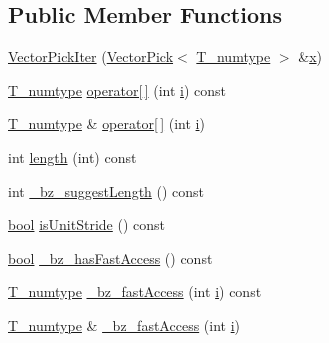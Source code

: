 \subsection*{Public Member Functions}
\begin{DoxyCompactItemize}
\item 
\hyperlink{classVectorPickIter_a834212637140ee41fe3614c6af3f2b32}{Vector\+Pick\+Iter} (\hyperlink{classVectorPick}{Vector\+Pick}$<$ \hyperlink{classVectorPickIter_a105b4687faac1a8a5ee37bdec8163f92}{T\+\_\+numtype} $>$ \&\hyperlink{vecnorm1_8cc_ac73eed9e41ec09d58f112f06c2d6cb63}{x})
\item 
\hyperlink{classVectorPickIter_a105b4687faac1a8a5ee37bdec8163f92}{T\+\_\+numtype} \hyperlink{classVectorPickIter_a70b6552aec5448cd841bc0f677c3e2c6}{operator\mbox{[}$\,$\mbox{]}} (int \hyperlink{indexexpr_8h_aabd77643995707c185e95c8cb2782c81}{i}) const 
\item 
\hyperlink{classVectorPickIter_a105b4687faac1a8a5ee37bdec8163f92}{T\+\_\+numtype} \& \hyperlink{classVectorPickIter_a2bb0290a79c3f855b5ef93a18b09d722}{operator\mbox{[}$\,$\mbox{]}} (int \hyperlink{indexexpr_8h_aabd77643995707c185e95c8cb2782c81}{i})
\item 
int \hyperlink{classVectorPickIter_a8ce5e1eaf57976ae9048d4d364172b8c}{length} (int) const 
\item 
int \hyperlink{classVectorPickIter_a3e6561605f364f742cf77915cbeba6c5}{\+\_\+bz\+\_\+suggest\+Length} () const 
\item 
\hyperlink{compiler_8h_abb452686968e48b67397da5f97445f5b}{bool} \hyperlink{classVectorPickIter_a405f46975bde2f503fb3a2f1c4482e8f}{is\+Unit\+Stride} () const 
\item 
\hyperlink{compiler_8h_abb452686968e48b67397da5f97445f5b}{bool} \hyperlink{classVectorPickIter_a16937aaa4112db780056bd5dfb740bc6}{\+\_\+bz\+\_\+has\+Fast\+Access} () const 
\item 
\hyperlink{classVectorPickIter_a105b4687faac1a8a5ee37bdec8163f92}{T\+\_\+numtype} \hyperlink{classVectorPickIter_a1327eb4f9cd353758f61d07bb4ba97e9}{\+\_\+bz\+\_\+fast\+Access} (int \hyperlink{indexexpr_8h_aabd77643995707c185e95c8cb2782c81}{i}) const 
\item 
\hyperlink{classVectorPickIter_a105b4687faac1a8a5ee37bdec8163f92}{T\+\_\+numtype} \& \hyperlink{classVectorPickIter_a3bd9b0179ab6f664233f442758850201}{\+\_\+bz\+\_\+fast\+Access} (int \hyperlink{indexexpr_8h_aabd77643995707c185e95c8cb2782c81}{i})
\end{DoxyCompactItemize}
